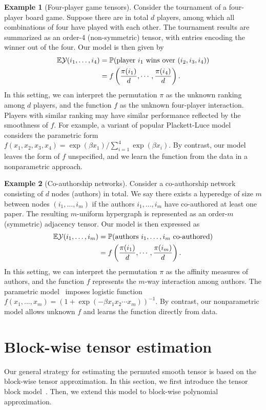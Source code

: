 \documentclass[12pt]{article}
\theoremstyle{definition}
\newtheorem{example}{Example}
\begin{document}
\begin{example}[Four-player game tensors] Consider the tournament of a four-player board game. Suppose there are in total $d$ players, among which all combinations of four have played with each other. The tournament results are summarized as an order-4 (non-symmetric) tensor, with entries encoding the winner out of the four. Our model is then given by
\begin{align}
\mathbb{E}\mathcal{Y}(i_1,\ldots,i_4)&=\mathbb{P}(\text{player $i_1$ wins over $(i_2,i_3,i_4)$})\\&
=f\left({\pi(i_1)\over d},\cdots, {\pi(i_4)\over d}\right).
\end{align}
In this setting, we can interpret the permutation $\pi$ as the unknown ranking among $d$ players, and the function $f$ as the unknown four-player interaction. Players with similar ranking may have similar performance reflected by the smoothness of $f$. For example, a variant of popular Plackett-Luce model~\cite{chen2021optimal} considers the parametric form $f(x_1,x_2,x_3,x_4)={\exp(\beta x_1)/ \sum_{i=1}^4\exp(\beta x_i)}$. By contrast, our model leaves the form of $f$ unspecified, and we learn the function from the data in a nonparametric approach. 
\end{example}

\begin{example}[Co-authorship networks] Consider a co-authorship network consisting of $d$ nodes (authors) in total. We say there exists a hyperedge of size $m$ between nodes $(i_1,\ldots,i_m)$ if the authors $i_1,\ldots,i_m$ have co-authored at least one paper. The resulting $m$-uniform hypergraph is represented as an order-$m$ (symmetric) adjacency tensor. Our model is then expressed as
\begin{align}
    \mathbb{E}\mathcal{Y}(i_1,\ldots,i_m)&=\mathbb{P}(\text{authors $i_1,\ldots,i_m$ co-authored})\\&
=f\left({\pi(i_1)\over d},\cdots, {\pi(i_m)\over d}\right).
\end{align}
In this setting, we can interpret the permutation $\pi$ as the affinity measures of authors, and the function $f$ represents the $m$-way interaction among authors. The parametric model~\cite{wang2018learning} imposes logistic function $f(x_1,\ldots,x_m)=(1+\exp(-\beta x_1x_2\cdots x_m))^{-1}$. By contrast, our nonparametric model allows unknown $f$ and learns the function directly from data. 
\end{example}


\section{Block-wise tensor estimation}\label{sec:tba}
Our general strategy for estimating the permuted smooth tensor is based on the block-wise tensor approximation. In this section, we first introduce the tensor block model~\citep{wang2019multiway,han2020exact}. Then, we extend this model to block-wise polynomial approximation.
\end{document}
